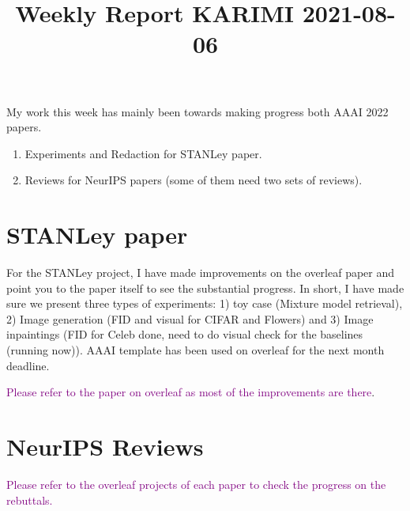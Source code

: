 \documentclass{article}
\begin{document}
\title{Weekly Report KARIMI 2021-08-06}


\date{}
\maketitle

\vspace{-0.5in}

My work this week has mainly been towards making progress both AAAI 2022 papers.
\begin{enumerate}
\item Experiments and Redaction for STANLey paper.
\item Reviews for NeurIPS papers (some of them need two sets of reviews).
\end{enumerate}



\section{STANLey paper}

For the STANLey project, I have made improvements on the overleaf paper and point you to the paper itself to see the substantial progress.
In short, I have made sure we present three types of experiments: 1) toy case (Mixture model retrieval), 2) Image generation (FID and visual for CIFAR and Flowers) and 3) Image inpaintings (FID for Celeb done, need to do visual check for the baselines (running now)).
AAAI template has been used on overleaf for the next month deadline.

\textcolor{purple}{Please refer to the paper on overleaf as most of the improvements are there}.


\section{NeurIPS Reviews}

\textcolor{purple}{Please refer to the overleaf projects of each paper to check the progress on the rebuttals.}




\end{document}
